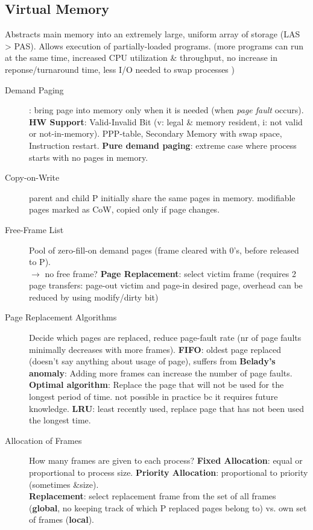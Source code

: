 \subsection*{Virtual Memory}
Abstracts main memory into an extremely large, uniform array of storage (LAS > PAS). Allows execution of partially-loaded programs. (more programs can run at the same time, increased CPU utilization \& throughput, no increase in reponse/turnaround time, less I/O needed to swap processes )
\begin{description}
    \item[Demand Paging]: bring page into memory only when it is needed (when \textit{page fault} occurs). \textbf{HW Support}: Valid-Invalid Bit (v: legal & memory resident, i: not valid or not-in-memory). PPP-table, Secondary Memory with swap space, Instruction restart. \textbf{Pure demand paging}: extreme case where process starts with no pages in memory.
    \item[Copy-on-Write]parent and child P initially share the same pages in memory. modifiable pages marked as CoW, copied only if page changes.
    \item[Free-Frame List]Pool of zero-fill-on demand pages (frame cleared with 0's, before released to P). \\ %
    $\rightarrow$ no free frame? \textbf{Page Replacement}: select victim frame (requires 2 page transfers: page-out victim and page-in desired page, overhead can be reduced by using modify/dirty bit) %
    \item[Page Replacement Algorithms] Decide which pages are replaced, reduce page-fault rate (nr of page faults minimally decreases with more frames). \textbf{FIFO}: oldest page replaced (doesn't say anything about usage of page), suffers from \textbf{Belady's anomaly}: Adding more frames can increase the number of page faults. \textbf{Optimal algorithm}: Replace the page that will not be used for the longest period of time. not possible in practice bc it  requires future knowledge. \textbf{LRU}: least recently used, replace page that has not been used the longest time.
    \item[Allocation of Frames]How many frames are given to each process? \textbf{Fixed Allocation}: equal or proportional to process size. \textbf{Priority Allocation}: proportional to priority (sometimes &size). \\
        \textbf{Replacement}: select replacement frame from the set of all frames (\textbf{global}, no keeping track of which P replaced pages belong to) vs. own set of frames (\textbf{local}).

\end{description}
